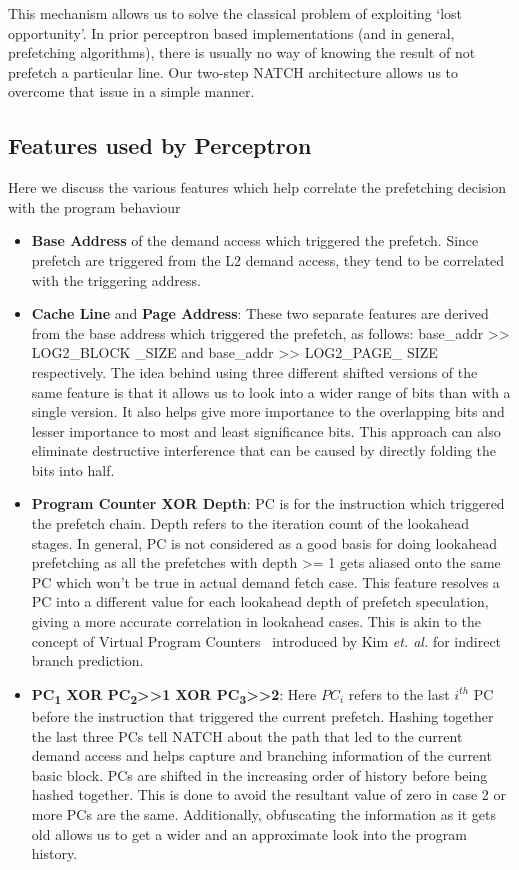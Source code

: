 This mechanism allows us to solve the classical problem of exploiting
`lost opportunity'.  In prior perceptron based implementations (and in
general, prefetching algorithms), there is usually no way of knowing
the result of not prefetch a particular line.  Our two-step NATCH
architecture allows us to overcome that issue in a simple manner.

\subsection{Features used by Perceptron}
\label{Design-Features}
Here we discuss the various features which help correlate the
prefetching decision with the program behaviour
\begin{itemize}
\item \textbf{Base Address} of the demand access which triggered the
  prefetch.  Since prefetch are triggered from the L2 demand access,
  they tend to be correlated with the triggering address.

\item \textbf{Cache Line} and \textbf{Page Address}: These two
  separate features are derived from the base address which triggered
  the prefetch, as follows: base\_addr >> LOG2\_BLOCK \_SIZE and
  base\_addr >> LOG2\_PAGE\_ SIZE respectively.  The idea behind using
  three different shifted versions of the same feature is that it
  allows us to look into a wider range of bits than with a single
  version.  It also helps give more importance to the overlapping bits
  and lesser importance to most and least significance bits.  This
  approach can also eliminate destructive interference that can be
  caused by directly folding the bits into half.


\item \textbf{Program Counter XOR Depth}: PC is for the instruction
  which triggered the prefetch chain.  Depth refers to the iteration
  count of the lookahead stages.  In general, PC is not considered as
  a good basis for doing lookahead prefetching as all the prefetches
  with depth >= 1 gets aliased onto the same PC which won't be true in
  actual demand fetch case.  This feature resolves a PC into a
  different value for each lookahead depth of prefetch speculation, giving
  a more accurate correlation in lookahead cases.  This is akin to the
  concept of Virtual Program Counters~\cite{VPC} introduced by Kim
  \textit{et. al.} for indirect branch prediction.


\item \textbf{PC\textsubscript{1} XOR PC\textsubscript{2}>>1 XOR
    PC\textsubscript{3}>>2}: Here $PC_i$ refers to the last $i^{th}$
  PC before the instruction that triggered the current prefetch.
  Hashing together the last three PCs tell NATCH about the path
  that led to the current demand access and helps capture and
  branching information of the current basic block.  PCs are shifted
  in the increasing order of history before being hashed together.
  This is done to avoid the resultant value of zero in case 2 or more
  PCs are the same.  Additionally, obfuscating the information as it
  gets old allows us to get a wider and an approximate look into the
  program history.


\end{itemize}
